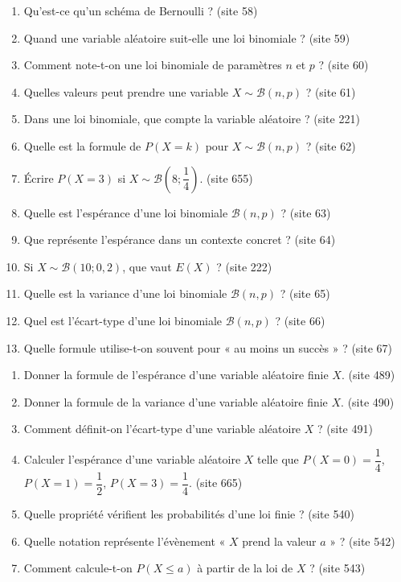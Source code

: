 \documentclass[11pt,a4paper]{article}
\newcommand{\origine}[1]{ {\scriptsize\textcolor{bleufonce}{(site #1)}}}
\newcounter{question}
\newenvironment{blocquestions}[1]{%
  \begin{tcolorbox}[
    enhanced,
    breakable,
    colback=bleuclair,
    colframe=bleufonce,
    boxrule=0.6pt,
    arc=2mm,
    left=2mm,right=2mm,top=2mm,bottom=1.5mm,
    title={\bfseries #1},
    coltitle=white,
    colbacktitle=bleufonce,
    before skip=3mm,
    after skip=3mm, fontupper=\large
  ]
  \large
  \begin{enumerate}[leftmargin=*,label=\textbf{\arabic*.},itemsep=0.45em,topsep=0.5em]
  \setcounter{enumi}{\value{question}}
}{%
  \setcounter{question}{\value{enumi}}
  \end{enumerate}
  \end{tcolorbox}
}
\begin{document}
\begin{blocquestions}{C. Loi binomiale}
\item Qu'est-ce qu'un schéma de Bernoulli ? \origine{58}
\item Quand une variable aléatoire suit-elle une loi binomiale ? \origine{59}
\item Comment note-t-on une loi binomiale de paramètres \(n\) et \(p\) ? \origine{60}
\item Quelles valeurs peut prendre une variable \(X\sim\mathcal{B}(n,p)\) ? \origine{61}
\item Dans une loi binomiale, que compte la variable aléatoire ? \origine{221}
\item Quelle est la formule de \(P(X=k)\) pour \(X\sim\mathcal{B}(n,p)\) ? \origine{62}
\item Écrire \(P(X=3)\) si \(X\sim\mathcal{B}\!\left(8;\dfrac14\right)\). \origine{655}
\item Quelle est l'espérance d'une loi binomiale \(\mathcal{B}(n,p)\) ? \origine{63}
\item Que représente l'espérance dans un contexte concret ? \origine{64}
\item Si \(X\sim\mathcal{B}(10;0{,}2)\), que vaut \(E(X)\) ? \origine{222}
\item Quelle est la variance d'une loi binomiale \(\mathcal{B}(n,p)\) ? \origine{65}
\item Quel est l'écart-type d'une loi binomiale \(\mathcal{B}(n,p)\) ? \origine{66}
\item Quelle formule utilise-t-on souvent pour « au moins un succès » ? \origine{67}
\end{blocquestions}

\begin{blocquestions}{D. Variables aléatoires finies}
\item Donner la formule de l'espérance d'une variable aléatoire finie \(X\). \origine{489}
\item Donner la formule de la variance d'une variable aléatoire finie \(X\). \origine{490}
\item Comment définit-on l'écart-type d'une variable aléatoire \(X\) ? \origine{491}
\item Calculer l'espérance d'une variable aléatoire \(X\) telle que \(P(X=0)=\dfrac14\), \(P(X=1)=\dfrac12\), \(P(X=3)=\dfrac14\). \origine{665}
\item Quelle propriété vérifient les probabilités d'une loi finie ? \origine{540}
\item Quelle notation représente l'évènement « \(X\) prend la valeur \(a\) » ? \origine{542}
\item Comment calcule-t-on \(P(X\leqslant a)\) à partir de la loi de \(X\) ? \origine{543}
\end{blocquestions}
\end{document}
